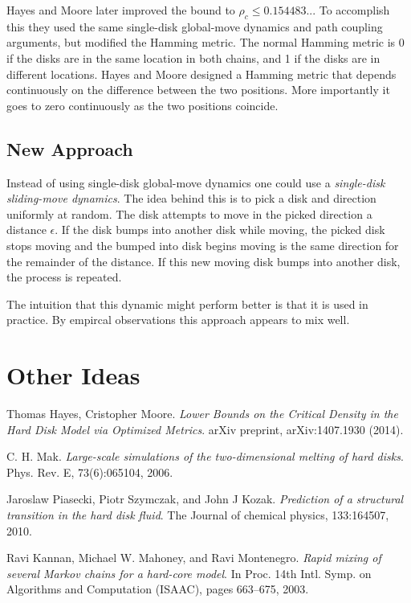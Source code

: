 \documentclass[a4paper,11pt]{article}
\begin{document}
Hayes and Moore \cite{Hayes} later improved the bound to $\rho_c \le 0.154483..$.  To accomplish this they used the same single-disk global-move dynamics and path coupling arguments, but modified the Hamming metric.  The normal Hamming metric is 0 if the disks are in the same location in both chains, and 1 if the disks are in different locations.  Hayes and Moore designed a Hamming metric that depends continuously on the difference between the two positions.  More importantly it goes to zero continuously as the two positions coincide.

\subsection*{New Approach}

Instead of using single-disk global-move dynamics one could use a \textit{single-disk sliding-move dynamics}.  The idea behind this is to pick a disk and direction uniformly at random.  The disk attempts to move in the picked direction a distance $\epsilon$.  If the disk bumps into another disk while moving, the picked disk stops moving and the bumped into disk begins moving is the same direction for the remainder of the distance.  If this new moving disk bumps into another disk, the process is repeated.

The intuition that this dynamic might perform better is that it is used in practice.  By empircal observations this approach appears to mix well.

\section*{Other Ideas}

\begin{thebibliography}{9}

  Thomas Hayes, Cristopher Moore.
  \emph{Lower Bounds on the Critical Density in the Hard Disk Model via Optimized Metrics}.
  arXiv preprint,
  arXiv:1407.1930 (2014).

  C. H. Mak. 
  \emph{Large-scale simulations of the two-dimensional melting of hard disks}.
  Phys. Rev. E,
  73(6):065104, 2006.

  Jaroslaw Piasecki, Piotr Szymczak, and John J Kozak.
  \emph{Prediction of a structural transition in the hard disk fluid}.
  The Journal of chemical physics,
  133:164507, 2010.

  Ravi Kannan, Michael W. Mahoney, and Ravi Montenegro.
  \emph{Rapid mixing of several Markov chains for a hard-core model}.
  In Proc. 14th Intl. Symp. on Algorithms and Computation (ISAAC),
  pages 663–675, 2003.


\end{thebibliography}
\end{document}
